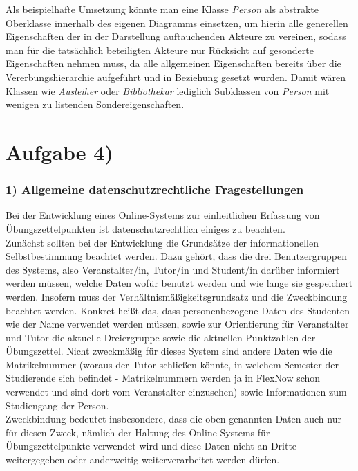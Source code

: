 \documentclass{swp1}
\begin{document}
Als beispielhafte Umsetzung könnte man eine Klasse \textit{Person} als abstrakte Oberklasse innerhalb des eigenen Diagramms einsetzen, um hierin alle generellen Eigenschaften der in der Darstellung auftauchenden Akteure zu vereinen, sodass man für die tatsächlich beteiligten Akteure nur Rücksicht auf gesonderte Eigenschaften nehmen muss, da alle allgemeinen Eigenschaften bereits über die Vererbungshierarchie aufgeführt und in Beziehung gesetzt wurden. Damit wären Klassen wie \emph{Ausleiher} oder \emph{Bibliothekar} lediglich Subklassen von \textit{Person} mit wenigen zu listenden Sondereigenschaften.

\section*{Aufgabe 4)}

\subsubsection*{1) Allgemeine datenschutzrechtliche Fragestellungen}

Bei der Entwicklung eines Online-Systems zur einheitlichen Erfassung von Übungszettelpunkten ist datenschutzrechtlich einiges zu beachten.\\
Zunächst sollten bei der Entwicklung die Grundsätze der informationellen Selbstbestimmung beachtet werden. Dazu gehört, dass die drei Benutzergruppen des Systems, also Veranstalter/in, Tutor/in und Student/in darüber informiert werden müssen, welche Daten wofür benutzt werden und wie lange sie gespeichert werden. Insofern muss der Verhältnismäßigkeitsgrundsatz und die Zweckbindung beachtet werden. Konkret heißt das, dass personenbezogene Daten des Studenten wie der Name verwendet werden müssen, sowie zur Orientierung für Veranstalter und Tutor die aktuelle Dreiergruppe sowie die aktuellen Punktzahlen der Übungszettel. Nicht zweckmäßig für dieses System sind andere Daten wie die Matrikelnummer (woraus der Tutor schließen könnte, in welchem Semester der Studierende sich befindet - Matrikelnummern werden ja in FlexNow schon verwendet und sind dort vom Veranstalter einzusehen) sowie Informationen zum  Studiengang der Person.   \\
Zweckbindung bedeutet insbesondere, dass die oben genannten Daten auch nur für diesen Zweck, nämlich der Haltung des Online-Systems für Übungszettelpunkte verwendet wird und diese Daten nicht an Dritte weitergegeben oder anderweitig weiterverarbeitet werden dürfen.\\
\end{document}
